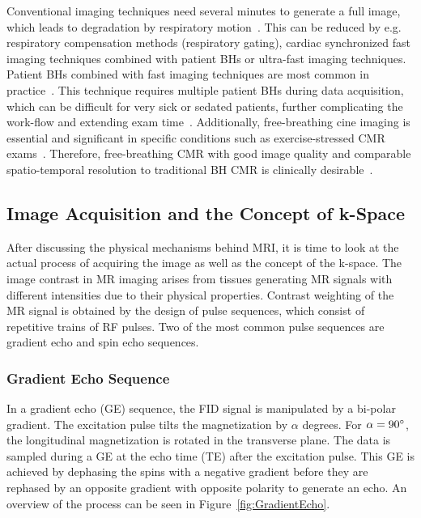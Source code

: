 \noindent Conventional imaging techniques need several minutes to generate a full image, which leads to degradation by respiratory motion~\cite{CineReview1}. This can be reduced by e.g. respiratory compensation methods (respiratory gating), cardiac synchronized fast imaging techniques combined with patient BHs or ultra-fast imaging techniques. Patient BHs combined with fast imaging techniques are most common in practice~\cite{CineReview1}. This technique requires multiple patient BHs during data acquisition, which can be difficult for very sick or sedated patients, further complicating the work-flow and extending exam time~\cite{Lin2022}. Additionally, free-breathing cine imaging is essential and significant in specific conditions such as exercise-stressed CMR exams~\cite{Chew2020}. Therefore, free-breathing CMR with good image quality and comparable spatio-temporal resolution to traditional BH CMR is clinically desirable~\cite{Wang2021}. 

\subsection{Image Acquisition and the Concept of k-Space} \label{SubSec:ImageAcquisitionAndK-Space}
After discussing the physical mechanisms behind MRI, it is time to look at the actual process of acquiring the image as well as the concept of the k-space. The image contrast in MR imaging arises from tissues generating MR signals with different intensities due to their physical properties. Contrast weighting of the MR signal is obtained by the design of pulse sequences, which consist of repetitive trains of RF pulses. Two of the most common pulse sequences are gradient echo and spin echo sequences. 

\subsubsection{Gradient Echo Sequence}
In a gradient echo (GE) sequence, the FID signal is manipulated by a bi-polar gradient. The excitation pulse tilts the magnetization by $\alpha$ degrees. For $\alpha = 90\degree$, the longitudinal magnetization is rotated in the transverse plane. The data is sampled during a GE at the echo time (TE) after the excitation pulse. This GE is achieved by dephasing the spins with a negative gradient before they are rephased by an opposite gradient with opposite polarity to generate an echo. An overview of the process can be seen in Figure~\ref{fig:GradientEcho}. 

